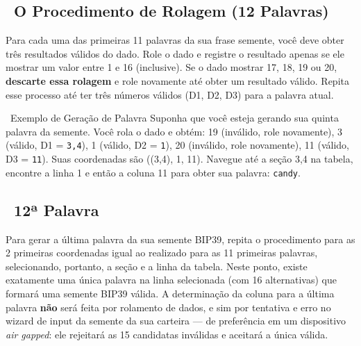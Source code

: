 \documentclass[10pt]{article}
\begin{document}
\subsection*{~O Procedimento de Rolagem (12 Palavras)}

Para cada uma das primeiras 11 palavras da sua frase semente, você deve obter três resultados válidos do dado. Role o dado e registre o resultado apenas se ele mostrar um valor entre 1 e 16 (inclusive). Se o dado mostrar 17, 18, 19 ou 20, \textbf{descarte essa rolagem} e role novamente até obter um resultado válido. Repita esse processo até ter três números válidos (D1, D2, D3) para a palavra atual.

\begin{examplebox}{\faLightbulb~Exemplo de Geração de Palavra}
Suponha que você esteja gerando sua quinta palavra da semente. Você rola o dado e obtém: 19 (inválido, role novamente), 3 (válido, D1 = \texttt{3,4}), 1 (válido, D2 = \texttt{1}), 20 (inválido, role novamente), 11 (válido, D3 = \texttt{11}). Suas coordenadas são ((3,4), 1, 11). Navegue até a seção 3,4 na tabela, encontre a linha 1 e então a coluna 11 para obter sua palavra: \texttt{candy}.
\end{examplebox}

\subsection*{\faPen~12ª Palavra}

Para gerar a última palavra da sua semente BIP39, repita o procedimento para as 2 primeiras coordenadas igual ao realizado para as 11 primeiras palavras, selecionando, portanto, a seção e a linha da tabela. Neste ponto, existe exatamente uma única palavra na linha selecionada (com 16 alternativas) que formará uma semente BIP39 válida. A determinação da coluna para a última palavra \textbf{não} será feita por rolamento de dados, e sim por tentativa e erro no wizard de input da semente da sua carteira --- de preferência em um dispositivo \textit{air gapped}: ele rejeitará as 15 candidatas inválidas e aceitará a única válida.
\end{document}
